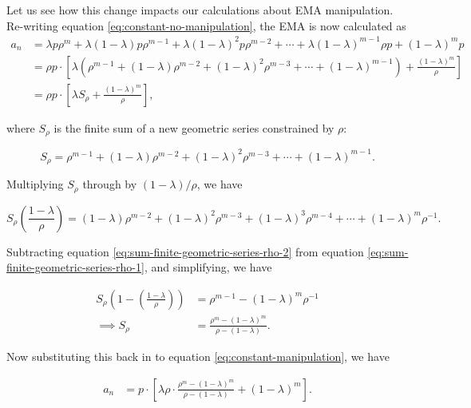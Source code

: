 \documentclass[bibliography=numbered]{article}
\begin{document}
Let us see how this change impacts our calculations about EMA manipulation. Re-writing equation \eqref{eq:constant-no-manipulation}, the EMA is now calculated as
\begin{align}
\label{eq:constant-manipulation}
a_{n}
&=
\lambda p \rho^{m} + \lambda (1 - \lambda) p \rho^{m - 1} + \lambda (1 - \lambda)^2 p \rho^{m - 2} + \cdots + \lambda (1 - \lambda)^{m - 1} \rho p + (1 - \lambda)^m p \\ \nonumber
&=
\rho p \cdot \left[ \lambda \left( \rho^{m - 1} + (1 - \lambda) \rho^{m - 2} + (1 - \lambda)^2 \rho^{m - 3} + \cdots + (1 - \lambda)^{m - 1} \right) + \frac{(1 - \lambda)^m}{\rho} \right] \\ \nonumber
&=
\rho p \cdot \left[ \lambda S_{\rho} + \frac{(1 - \lambda)^m}{\rho} \right],
\end{align}

where $S_\rho$ is the finite sum of a new geometric series constrained by $\rho$:

\begin{equation}
    \label{eq:sum-finite-geometric-series-rho-1}
    S_{\rho} = \rho^{m - 1} + (1 - \lambda) \rho^{m - 2} + (1 - \lambda)^2 \rho^{m - 3} + \cdots + (1 - \lambda)^{m - 1}.
\end{equation}

Multiplying $S_{\rho}$ through by $(1 - \lambda) / \rho$, we have

\begin{equation}
    \label{eq:sum-finite-geometric-series-rho-2}
    S_{\rho} \left( \frac{1 - \lambda}{\rho} \right) = (1 - \lambda) \rho^{m - 2} + (1 - \lambda)^2 \rho^{m - 3} + (1 - \lambda)^3 \rho^{m - 4} + \cdots + (1 - \lambda)^{m} \rho^{-1}.
\end{equation}

Subtracting equation \eqref{eq:sum-finite-geometric-series-rho-2} from equation \eqref{eq:sum-finite-geometric-series-rho-1}, and simplifying, we have

\begin{align}
    S_{\rho} \left( 1 - \left( \frac{1 - \lambda}{\rho} \right) \right)
    &=
    \rho^{m - 1} - (1 - \lambda)^{m} \rho^{-1} \\ \nonumber
    \implies S_{\rho} 
    &= 
    \frac{\rho^{m} - (1 - \lambda)^{m}}{\rho - \left( 1 - \lambda \right)}.
\end{align}

Now substituting this back in to equation \eqref{eq:constant-manipulation}, we have

\begin{align}
\label{eq:constant-manipulation}
a_{n}
&=
p \cdot \left[ \lambda \rho \cdot \frac{\rho^{m} - (1 - \lambda)^{m}}{\rho - \left( 1 - \lambda \right)} + (1 - \lambda)^m \right].
\end{align}
\end{document}
